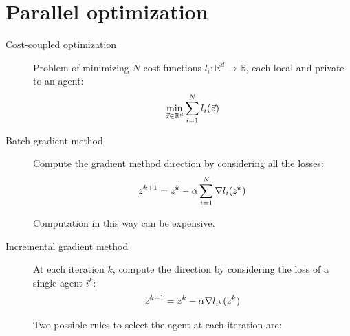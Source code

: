 \section{Parallel optimization}


\begin{description}
    \item[Cost-coupled optimization] 
        Problem of minimizing $N$ cost functions $l_i: \mathbb{R}^d \rightarrow \mathbb{R}$, each local and private to an agent:
        \[
            \min_{{\vec{z}} \in \mathbb{R}^{d}} \sum_{i=1}^{N} l_i({\vec{z}})
        \]
    
    \item[Batch gradient method] 
        Compute the gradient method direction by considering all the losses:
        \[
            {\vec{z}}^{k+1} = {\vec{z}}^k - \alpha \sum_{i=1}^{N} \nabla l_i({\vec{z}}^k)
        \]

        \begin{remark}
            Computation in this way can be expensive.
        \end{remark}

    \item[Incremental gradient method] 
        At each iteration $k$, compute the direction by considering the loss of a single agent $i^k$:
        \[
            {\vec{z}}^{k+1} = {\vec{z}}^k - \alpha \nabla l_{i^k}({\vec{z}}^k)
        \]

        \begin{remark}
            Two possible rules to select the agent at each iteration are:
        \end{remark}
\end{description}